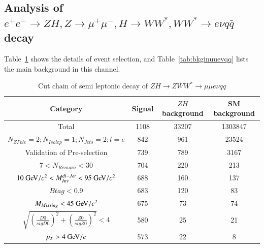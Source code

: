 \documentclass[11pt,a4paper]{cepcnote}
\begin{document}
\subsection{Analysis of $e^+e^-\rightarrow ZH, Z\rightarrow \mu^+\mu^-, H\rightarrow WW^*, WW^*\rightarrow e\nu q\bar{q}$ decay}
Table~\ref{tab:cutchainuuevqq} shows the details of event selection, and Table~\ref{tab:bkginuuevqq} lists the main background in 
this channel.
\begin{table}[H]
  \begin{center}
    \begin{tabular}{cccc}
      \hline \hline
      \multicolumn{1}{c}{Category}&\multicolumn{1}{c}{Signal}&\multicolumn{1}{c}{$ZH$ background}&\multicolumn{1}{c}{SM background}\\ 
      \hline
      Total 	      	 									&   1108	& 33207	& 1303847\\
      $N_{ZPole}=2; N_{Isolep}=1; N_{Jets} =2; l = e$		&   842		& 961	& 23524\\
	  Validation of Pre-selection							&	739		& 789	& 3167	\\
	  $7 < N_{Remain} < 30$									&	704		& 220	& 213\\
	  $10\gev/c^2 < M_{Inv}^{di-Jet} < 95\gev/c^2 $			&	688		& 160	& 137\\
	  $Btag < 0.9$											&	683		& 120	& 83\\
	  $M_{Missing} < 45\gev/c^2$							&   675		&  73	& 74\\
	  $\sqrt{(\frac{D0}{sigD0})^2+(\frac{Z0}{sigZ0})^2} < 4$&   580   	&  25 	& 21\\
	  $p_T > 4 \gev/c$										&	573		&  22	& 8\\
      \hline \hline
    \end{tabular}
  \caption[Monte Carlo purities in the single lepton sample]{%
    Cut chain of semi leptonic decay of $ZH\rightarrow ZWW^* \rightarrow \mu\mu e\nu qq$}
  \label{tab:cutchainuuevqq}
  \end{center}
\end{table}
\end{document}
